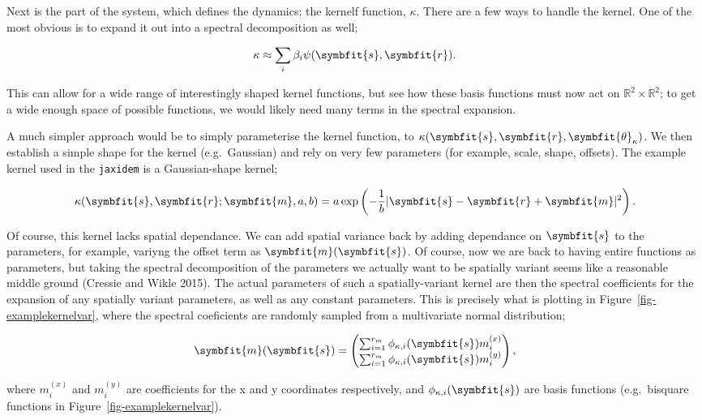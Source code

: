 \documentclass[
]{report}
\newcommand{\bv}[1]{\symbfit{#1}}
\theoremstyle{plain}
\theoremstyle{plain}
\theoremstyle{plain}
\theoremstyle{remark}
\begin{document}
Next is the part of the system, which defines the dynamics; the kernelf
function, \(\kappa\). There are a few ways to handle the kernel. One of
the most obvious is to expand it out into a spectral decomposition as
well;

\[\kappa \approx \sum_i \beta_i\psi(\bv s, \bv r).
\]

This can allow for a wide range of interestingly shaped kernel
functions, but see how these basis functions must now act on
\(\mathbb R^2\times \mathbb R^2\); to get a wide enough space of
possible functions, we would likely need many terms in the spectral
expansion.

A much simpler approach would be to simply parameterise the kernel
function, to \(\kappa(\bv s, \bv r, \bv \theta_\kappa)\). We then
establish a simple shape for the kernel (e.g.~Gaussian) and rely on very
few parameters (for example, scale, shape, offsets). The example kernel
used in the \texttt{jaxidem} is a Gaussian-shape kernel;

\[\kappa(\bv s, \bv r; \bv m, a, b) = a \exp \left( -\frac{1}{b} \vert \bv s- \bv r +\bv m\vert^2 \right). 
\]

Of course, this kernel lacks spatial dependance. We can add spatial
variance back by adding dependance on \(\bv s\) to the parameters, for
example, variyng the offset term as \(\bv m(\bv s)\). Of course, now we
are back to having entire functions as parameters, but taking the
spectral decomposition of the parameters we actually want to be
spatially variant seems like a reasonable middle ground (Cressie and
Wikle 2015). The actual parameters of such a spatially-variant kernel
are then the spectral coefficients for the expansion of any spatially
variant parameters, as well as any constant parameters. This is
precisely what is plotting in Figure~\ref{fig-examplekernelvar}, where
the spectral coeficients are randomly sampled from a multivariate normal
distribution;

\[\begin{split}
  \bv m(\bv s) = \left(\begin{matrix}
    \sum_{i=1}^{r_m} \phi_{\kappa,i}(\bv s) m^{(x)}_i\\
    \sum_{i=1}^{r_m} \phi_{\kappa,i}(\bv s) m^{(y)}_i
  \end{matrix}\right),
\end{split}
\]

where \(m^{(x)}_i\) and \(m^{(y)}_i\) are coefficients for the x and y
coordinates respectively, and \(\phi_{\kappa, i}(\bv s)\) are basis
functions (e.g.~bisquare functions in
Figure~\ref{fig-examplekernelvar}).
\end{document}
